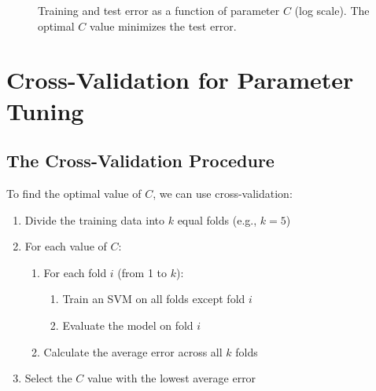 \documentclass{article}
\begin{document}
\begin{figure}[h]
\centering
{}
\caption{Training and test error as a function of parameter $C$ (log scale). The optimal $C$ value minimizes the test error.}
\end{figure}

\section{Cross-Validation for Parameter Tuning}

\subsection{The Cross-Validation Procedure}
To find the optimal value of $C$, we can use cross-validation:

\begin{enumerate}
    \item Divide the training data into $k$ equal folds (e.g., $k = 5$)
    \item For each value of $C$:
    \begin{enumerate}
        \item For each fold $i$ (from 1 to $k$):
        \begin{enumerate}
            \item Train an SVM on all folds except fold $i$
            \item Evaluate the model on fold $i$
        \end{enumerate}
        \item Calculate the average error across all $k$ folds
    \end{enumerate}
    \item Select the $C$ value with the lowest average error
\end{enumerate}
\end{document}
